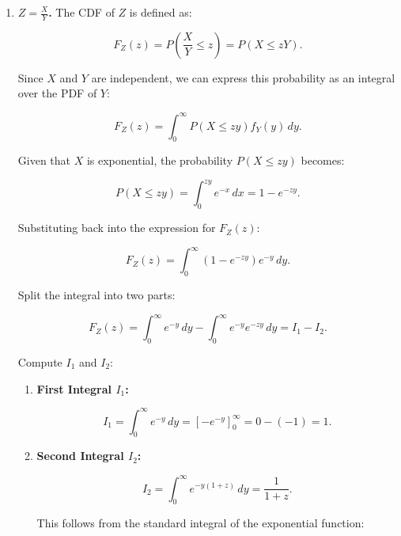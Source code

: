 \documentclass[a4paper, 8pt]{article}
\begin{document}
\begin{enumerate}[label=\alph*)]
\begin{enumerate}[label=\roman*)]
              \item \textbf{$Z = \frac{X}{Y}$.}
                    The CDF of \( Z \) is defined as:

                    \[
                        F_Z(z) = P\left( \dfrac{X}{Y} \leq z \right) = P(X \leq zY).
                    \]

                    Since \( X \) and \( Y \) are independent, we can express this probability as an integral over the PDF of \( Y \):

                    \[
                        F_Z(z) = \int_{0}^{\infty} P(X \leq zy) f_Y(y) \, dy.
                    \]

                    Given that \( X \) is exponential, the probability \( P(X \leq zy) \) becomes:

                    \[
                        P(X \leq zy) = \int_{0}^{zy} e^{-x} \, dx = 1 - e^{-zy}.
                    \]

                    Substituting back into the expression for \( F_Z(z) \):

                    \[
                        F_Z(z) = \int_{0}^{\infty} \left(1 - e^{-zy}\right) e^{-y} \, dy.
                    \]


                    Split the integral into two parts:

                    \[
                        F_Z(z) = \int_{0}^{\infty} e^{-y} \, dy - \int_{0}^{\infty} e^{-y} e^{-zy} \, dy = I_1 - I_2.
                    \]

                    Compute \( I_1 \) and \( I_2 \):

                    \begin{enumerate}[label=(\alph*)]
                        \item \textbf{First Integral \( I_1 \):}

                              \[
                                  I_1 = \int_{0}^{\infty} e^{-y} \, dy = \left[ -e^{-y} \right]_0^\infty = 0 - (-1) = 1.
                              \]

                        \item \textbf{Second Integral \( I_2 \):}

                              \[
                                  I_2 = \int_{0}^{\infty} e^{-y(1 + z)} \, dy = \frac{1}{1 + z}.
                              \]

                              This follows from the standard integral of the exponential function:


\end{enumerate}
\end{enumerate}
\end{enumerate}
\end{document}
